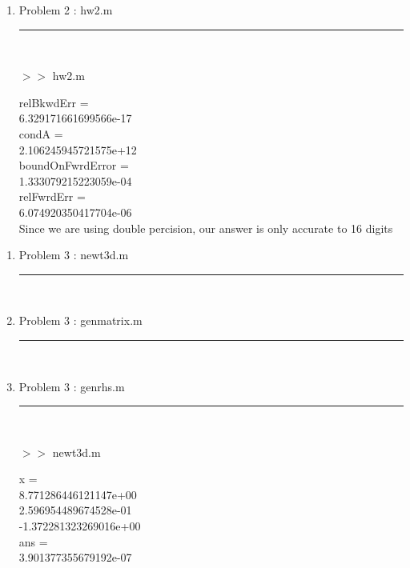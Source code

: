 \documentclass[12pt]{article}
\newcommand*\lstinputpath[1]{\lstset{inputpath=#1}}
\begin{document}
\pagebreak	
	
	\begin{enumerate}
	
	\item[] Problem 2 : hw2.m \noindent\rule{\textwidth}{1.0pt} \\
	\lstinputpath{P2}
		
	
	\pagebreak	
	
	$>>$ hw2.m
	\begin{framed}
relBkwdErr =\\
     6.329171661699566e-17\\

condA =\\
     2.106245945721575e+12\\


boundOnFwrdError =\\
     1.333079215223059e-04\\


relFwrdErr =\\
     6.074920350417704e-06\\

Since we are using double percision, our answer is only accurate to 16 digits
	\end{framed}
	
	\end{enumerate}
	
\pagebreak	
	
	\begin{enumerate}
	
	\item[] Problem 3 : newt3d.m \noindent\rule{\textwidth}{1.0pt} \\
	\lstinputpath{P3}
		
	
	\item[] Problem 3 : genmatrix.m \noindent\rule{\textwidth}{1.0pt} \\
		
	
	\item[] Problem 3 : genrhs.m \noindent\rule{\textwidth}{1.0pt} \\
		
	
	\pagebreak	
	
	$>>$ newt3d.m
	\begin{framed}
	x =\\
     8.771286446121147e+00\\
     2.596954489674528e-01\\
    -1.372281323269016e+00\\

ans =\\
     3.901377355679192e-07
	\end{framed}
	
	\end{enumerate}
	
\end{document}
